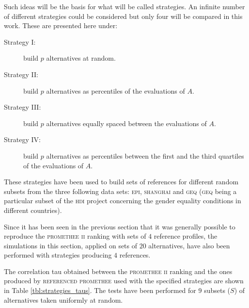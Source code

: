 Such ideas will be the basis for what will be called strategies.
An infinite number of different strategies could be considered but only four will be compared in this work. These are presented here under:

\begin{description}
    \item[Strategy I:] build $p$ alternatives at random.
    \item[Strategy II:] build $p$ alternatives as percentiles of the evaluations of $A$.
    \item[Strategy III:] build $p$ alternatives equally spaced between the evaluations of $A$.
    \item[Strategy IV:] build $p$ alternatives as percentiles between the first and the third quartiles of the evaluations of $A$.
\end{description}

These strategies have been used to build sets of references for different random subsets from the three following data sets: \textsc{epi}, \textsc{shanghai} and \textsc{geq} (\textsc{geq} being a particular subset of the \textsc{hdi} project concerning the gender equality conditions in different countries).

Since it has been seen in the previous section that it was generally possible to reproduce the \textsc{promethee ii} ranking with sets of $4$ reference profiles, the simulations in this section, applied on sets of $20$ alternatives, have also been performed with strategies producing $4$ references.

The correlation tau obtained between the \textsc{promethee ii} ranking and the ones produced by \textsc{referenced promethee} used with the specified strategies are shown in Table \ref{tbl:strategies_taus}.
The tests have been performed for 9 subsets ($S$) of alternatives taken uniformly at random.

